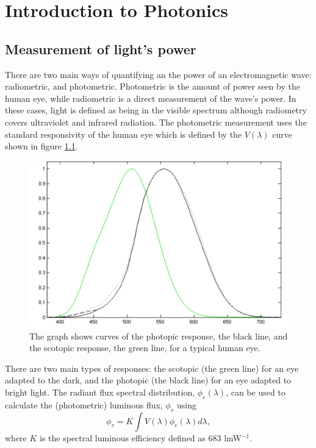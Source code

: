 \chapter{Introduction to Photonics}
\minitoc
\pagebreak
\section{Measurement of light's power}
There are two main ways of quantifying an the power of an electromagnetic wave: radiometric, and photometric.
 Photometric is the amount of power seen by the human eye, while radiometric is a direct measurement of the wave's power.
 In these cases, light is defined as being in the visible spectrum although radiometry covers ultraviolet and infrared radiation.
 The photometric measurement uses the standard responsivity of the human eye which is defined by the $V(\lambda)$ curve  shown in figure \ref{fig:eye}.
%
\begin{figure}[H]
	\includegraphics[width=\linewidth]{eye}
	\caption{The graph shows curves of the photopic response, the black line, and the scotopic response, the green line, for a typical human eye.}
	\label{fig:eye}
\end{figure}
%
There are two main types of responses: the scotopic (the green line) for an eye adapted to the dark, and the photopic (the black line) for an eye adapted to bright light.
 The radiant flux spectral distribution, $\phi_e(\lambda)$, can be used to calculate the (photometric) luminous flux, $\phi_v$ using
%
\begin{equation}
	\phi_v = K\int{V(\lambda)\phi_e(\lambda)d\lambda},
	\label{eq:luminous}
\end{equation}
%
where $K$ is the spectral luminous efficiency defined as $683$ lmW$^{-1}$.
